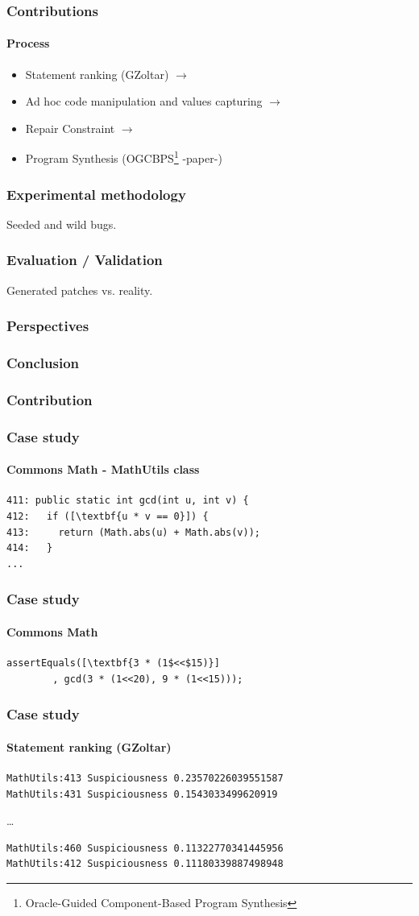 \documentclass[onlymath]{beamer}
\begin{document}
  \frame
  {  
    \frametitle{Contributions}
      \framesubtitle{Process}
\begin{itemize}
\item Statement ranking (GZoltar)  $\rightarrow$
\item Ad hoc code manipulation and values capturing $\rightarrow$
\item Repair Constraint  $\rightarrow$
\item Program Synthesis (OGCBPS\footnote{Oracle-Guided Component-Based Program Synthesis} -paper-)
\end{itemize}
}


  \frame
  {
    \frametitle{Experimental methodology}
    Seeded and wild bugs.
  }
  
  \frame
  {
    \frametitle{Evaluation / Validation}
    Generated patches vs. reality.
  }
  
  \frame
  {
    \frametitle{Perspectives}
    
  }
  
  \frame
  {
    \frametitle{Conclusion}
    
  }

  \frame
  {
    \frametitle{Contribution}
    
  }
  
 \begin{frame}[fragile]
    \frametitle{Case study}
      \framesubtitle{Commons Math - MathUtils class}
\begin{lstlisting}[escapeinside=\[\]]
411: public static int gcd(int u, int v) {
412:   if ([\textbf{u * v == 0}]) {
413:     return (Math.abs(u) + Math.abs(v));
414:   }
...
\end{lstlisting}
\end{frame}

 \begin{frame}[fragile]
    \frametitle{Case study}
      \framesubtitle{Commons Math}
        \begin{lstlisting}[escapeinside=\[\]]
assertEquals([\textbf{3 * (1$<<$15)}]
        , gcd(3 * (1<<20), 9 * (1<<15)));
	\end{lstlisting}
\end{frame}

 \begin{frame}[fragile]
    \frametitle{Case study}
      \framesubtitle{Statement ranking (GZoltar)}
\begin{verbatim}
MathUtils:413 Suspiciousness 0.23570226039551587
MathUtils:431 Suspiciousness 0.1543033499620919
\end{verbatim}
\dots
\begin{verbatim}
MathUtils:460 Suspiciousness 0.11322770341445956
MathUtils:412 Suspiciousness 0.11180339887498948
\end{verbatim}
\end{frame}
\end{document}
